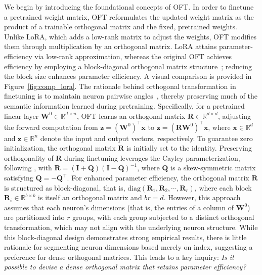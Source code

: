We begin by introducing the foundational concepts of OFT. In order to finetune a pretrained weight matrix, OFT reformulates the updated weight matrix as the product of a trainable orthogonal matrix and the fixed, pretrained weights. Unlike LoRA, which adds a low-rank matrix to adjust the weights, OFT modifies them through multiplication by an orthogonal matrix. LoRA attains parameter-efficiency via low-rank approximation, whereas the original OFT achieves efficiency by employing a block-diagonal orthogonal matrix structure~\cite{qiu2023controlling}; reducing the block size enhances parameter efficiency. A visual comparison is provided in Figure~\ref{fig:comp_lora}. The rationale behind orthogonal transformation in finetuning is to maintain neuron pairwise angles~\cite{liu2018learning,liu2021orthogonal,qiu2023controlling}, thereby preserving much of the semantic information learned during pretraining. Specifically, for a pretrained linear layer $\bm{W}^0\in\mathbb{R}^{d\times n}$, OFT learns an orthogonal matrix $\bm{R}\in\mathbb{R}^{d\times d}$, adjusting the forward computation from $\bm{z}=(\bm{W}^0)^\top\bm{x}$ to $\bm{z}=(\bm{R}\bm{W}^0)^\top\bm{x}$, where $\bm{x}\in\mathbb{R}^{d}$ and $\bm{z}\in\mathbb{R}^{n}$ denote the input and output vectors, respectively. To guarantee zero initialization, the orthogonal matrix $\bm{R}$ is initially set to the identity. Preserving orthogonality of $\bm{R}$ during finetuning leverages the Cayley parameterization, following \cite{qiu2023controlling,liu2021orthogonal}, with $\bm{R}=(\bm{I}+\bm{Q})(\bm{I}-\bm{Q})^{-1}$, where $\bm{Q}$ is a skew-symmetric matrix satisfying $\bm{Q}=-\bm{Q}^\top$. For enhanced parameter efficiency, the orthogonal matrix $\bm{R}$ is structured as block-diagonal, that is, $\text{diag}(\bm{R}_1,\bm{R}_2,\cdots,\bm{R}_r)$, where each block $\bm{R}_i\in\mathbb{R}^{b\times b}$ is itself an orthogonal matrix and $br = d$. However, this approach assumes that each neuron’s dimensions (that is, the entries of a column of $\bm{W}^0$) are partitioned into $r$ groups, with each group subjected to a distinct orthogonal transformation, which may not align with the underlying neuron structure. While this block-diagonal design demonstrates strong empirical results, there is little rationale for segmenting neuron dimensions based merely on index, suggesting a preference for dense orthogonal matrices. This leads to a key inquiry: \emph{Is it possible to devise a dense orthogonal matrix that retains parameter efficiency?}

